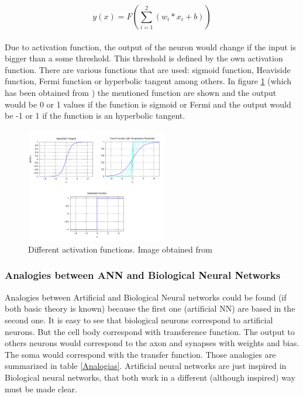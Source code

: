 			\begin{equation}
			y(x)=F(\sum_{i=1}^{2} (w_{i}*x_{i} + b) )
			\label{eq:ecuation_neuronasencilla}
			\end{equation}\\


Due to activation function, the output of the neuron would change if the input is bigger than a some threshold. This threshold is defined by the own activation function. There are various functions that are used: sigmoid function, Heaviside function, Fermi function or hyperbolic tangent among others. In figure \ref{fig:activation_function} (which has been obtained from \cite{BINN}) the mentioned function are shown and the output would be 0 or 1 values if the function is sigmoid or Fermi and the output would be -1 or 1 if the function is an hyperbolic tangent. \\

\begin{figure}[htb]
\centering
\includegraphics[width=0.55\textwidth]{images_miscelaneus/activation_function.PNG}
\caption{Different activation functions. Image obtained from \cite{BINN}} \label{fig:activation_function}
\end{figure}

\subsubsection{Analogies between ANN and Biological Neural Networks}
Analogies between Artificial and Biological Neural networks could be found (if both basic theory is known) because the first one (artificial NN) are based in the second one. It is easy to see that biological neurons correspond to artificial neurons. But the cell body correspond with transference function. The output to others neurons would correspond to the axon and synapses with weights and bias. The soma would correspond with the transfer function. Those analogies are summarized in table \ref{Analogias}. Artificial neural networks are just inspired in Biological neural networks, that both work in a different (although inspired) way must be made clear.\\

